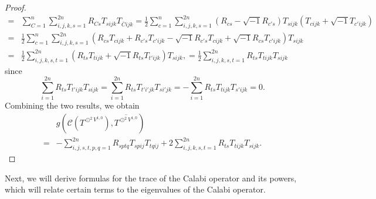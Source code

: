 \documentclass{amsart}
\theoremstyle{definition}
\theoremstyle{remark}
\numberwithin{equation}{section}
\begin{document}
\begin{proof}
\begin{align*}
   =& \sum\limits_{C = 1}^n {\sum\limits_{i,j,k,s = 1}^{2n} {{R_{Cs}}{T_{sijk}}{T_{\overline C ijk}}} }
   = \frac{1}{2}\sum\limits_{c = 1}^n {\sum\limits_{i,j,k,s = 1}^{2n} {\left( {{R_{cs}} - \sqrt { - 1} {R_{c's}}} \right){T_{sijk}}\left( {{T_{cijk}} + \sqrt { - 1} {T_{c'ijk}}} \right)} }   \\
   =& \frac{1}{2}\sum\limits_{c = 1}^n {\sum\limits_{i,j,k,s = 1}^{2n} {\left( {{R_{cs}}{T_{cijk}} + {R_{c's}}{T_{c'ijk}} - \sqrt { - 1} {R_{c's}}{T_{cijk}} + \sqrt { - 1} {R_{cs}}{T_{c'ijk}}} \right){T_{sijk}}} }  \\
   =& \frac{1}{2}\sum\limits_{i,j,k,s,t = 1}^{2n} {\left( {{R_{ts}}{T_{tijk}} + \sqrt { - 1} {R_{ts}}{T_{t'ijk}}} \right){T_{sijk}}},
   = \frac{1}{2}\sum\limits_{i,j,k,s,t = 1}^{2n} { {{R_{ts}}{T_{tijk}} } {T_{sijk}}}
\end{align*}
since
$$\sum\limits_{i = 1}^{2n} {{R_{ts}}{T_{t'ijk}}{T_{sijk}}}  = \sum\limits_{i = 1}^{2n} {{R_{ts}}{T_{t'i'jk}}{T_{si'jk}}}  =  - \sum\limits_{i = 1}^{2n} {{R_{ts}}{T_{tijk}}{T_{s'ijk}}}  = 0.$$
Combining the two results, we obtain
\begin{align*}
&g\left( {{\mathcal{C} }\left( {{T^{{ \odot ^2}{V^{1,0}}}}} \right),\overline {{T^{{ \odot ^2}{V^{1,0}}}}} } \right)  \\
 =&   - \sum\limits_{i,j,s,t,p,q = 1}^{2n} {{R_{sptq}}{T_{spij}}{T_{tqij}}}  + 2\sum\limits_{i,j,k,s,t = 1}^{2n} {{R_{ts}}{T_{tijk}}{T_{sijk}}}  .
\end{align*}
\end{proof}

Next, we will derive formulas for the trace of the Calabi operator and its powers, which will relate certain terms to the eigenvalues of the Calabi operator.
\end{document}
